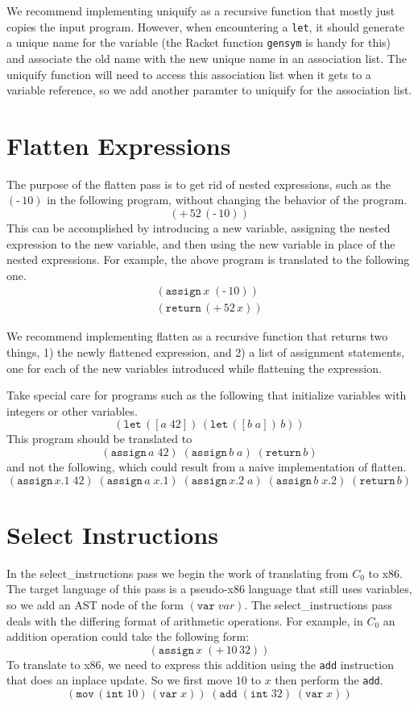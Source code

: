\documentclass[12pt]{book}
\newcommand{\itm}[1]{\ensuremath{\mathit{#1}}}
\newcommand{\key}[1]{\texttt{#1}}
\newcommand{\UNIOP}[2]{(\key{#1}\,#2)}
\newcommand{\BINOP}[3]{(\key{#1}\,#2\,#3)}
\newcommand{\LET}[3]{(\key{let}\,([#1\;#2])\,#3)}
\newcommand{\ASSIGN}[2]{(\key{assign}\,#1\;#2)}
\newcommand{\RETURN}[1]{(\key{return}\,#1)}
\newcommand{\INT}[1]{(\key{int}\;#1)}
\newcommand{\VAR}[1]{(\key{var}\;#1)}
\begin{document}
We recommend implementing \textsf{uniquify} as a recursive function
that mostly just copies the input program. However, when encountering
a \key{let}, it should generate a unique name for the variable (the
Racket function \key{gensym} is handy for this) and associate the old
name with the new unique name in an association list. The
\textsf{uniquify} function will need to access this association list
when it gets to a variable reference, so we add another paramter to
\textsf{uniquify} for the association list.

\section{Flatten Expressions}

The purpose of the \textsf{flatten} pass is to get rid of nested
expressions, such as the $\UNIOP{-}{10}$ in the following program,
without changing the behavior of the program.
\[
\BINOP{+}{52}{ \UNIOP{-}{10} }
\]
This can be accomplished by introducing a new variable, assigning the
nested expression to the new variable, and then using the new variable
in place of the nested expressions. For example, the above program is
translated to the following one.
\[
\begin{array}{l}
\ASSIGN{ \itm{x} }{ \UNIOP{-}{10} } \\
\RETURN{ \BINOP{+}{52}{ \itm{x} } }
\end{array}
\]

We recommend implementing \textsf{flatten} as a recursive function
that returns two things, 1) the newly flattened expression, and 2) a
list of assignment statements, one for each of the new variables
introduced while flattening the expression.

Take special care for programs such as the following that initialize
variables with integers or other variables.
\[
\LET{a}{42}{ \LET{b}{a}{ b }}
\]
This program should be translated to 
\[
\ASSIGN{a}{42} \;
\ASSIGN{b}{a} \;
\RETURN{b}
\]
and not the following, which could result from a naive implementation
of \textsf{flatten}.
\[
\ASSIGN{x.1}{42}\;
\ASSIGN{a}{x.1}\;
\ASSIGN{x.2}{a}\;
\ASSIGN{b}{x.2}\;
\RETURN{b}
\]

\section{Select Instructions}

In the \textsf{select\_instructions} pass we begin the work of
translating from $C_0$ to x86. The target language of this pass is a
pseudo-x86 language that still uses variables, so we add an AST node
of the form $\VAR{\itm{var}}$.  The \textsf{select\_instructions} pass
deals with the differing format of arithmetic operations. For example,
in $C_0$ an addition operation could take the following form:
\[
\ASSIGN{x}{ \BINOP{+}{10}{32} }
\]
To translate to x86, we need to express this addition using the
\key{add} instruction that does an inplace update. So we first move
$10$ to $x$ then perform the \key{add}.
\[
(\key{mov}\,\INT{10}\, \VAR{x})\; (\key{add} \;\INT{32}\; \VAR{x})
\]
\end{document}
